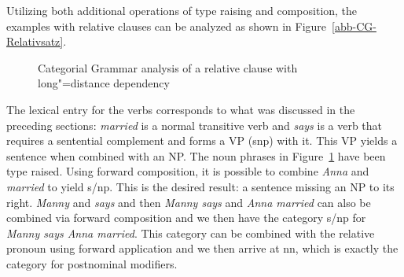 Utilizing both additional operations of type raising and composition, the examples with relative clauses can be analyzed as shown in
Figure~\vref{abb-CG-Relativsatz}.
%
\begin{figure}
\centerline{%
}
\caption{\label{abb-CG-Relativsatz}Categorial Grammar analysis of a relative clause with long"=distance dependency}
\end{figure}%
%
The lexical entry for the verbs corresponds to what was discussed in the preceding sections: \emph{married} is a normal transitive verb and 
 \emph{says} is a verb that requires a sentential complement and forms a VP (s\bs np) with it. This VP yields a sentence when combined
 with an NP. The noun phrases in Figure~\ref{abb-CG-Relativsatz} have been type raised. Using forward composition, it is possible to combine 
 \emph{Anna} and \emph{married} to yield s/np. This is the desired result: a sentence missing an NP to its right. \emph{Manny}
and \emph{says} and then \emph{Manny says} and \emph{Anna married} can also be combined via forward composition and we then have the category
s/np for \emph{Manny says Anna married}. This category can be combined with the relative pronoun using forward application and we then arrive at
n\bs n, which is exactly the category for postnominal modifiers.


